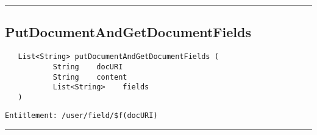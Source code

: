 \rule{12cm}{2pt}
\subsection{PutDocumentAndGetDocumentFields}
\label{Api:PutDocumentAndGetDocumentFields}
\begin{verbatim}
   List<String> putDocumentAndGetDocumentFields (
           String    docURI
           String    content
           List<String>    fields
   )
\end{verbatim}
\begin{Verbatim}[fontsize=\small, formatcom=\color{Maroon}]
  Entitlement: /user/field/$f(docURI)
\end{Verbatim}



\rule{12cm}{2pt}

